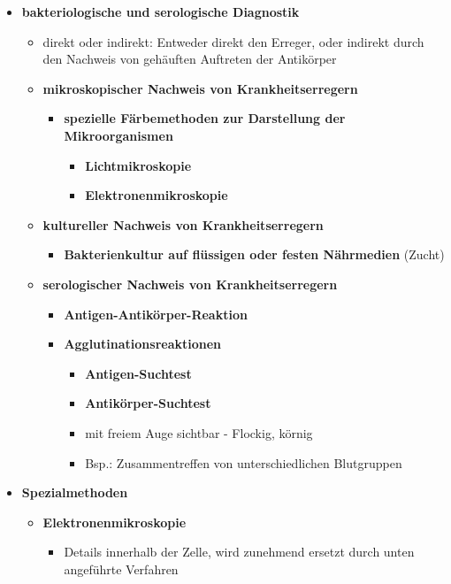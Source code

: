 \begin{itemize}
\pagebreak
		\item \textbf{bakteriologische und serologische Diagnostik}
			\begin{itemize}
				\item direkt oder indirekt: Entweder direkt den Erreger, oder indirekt durch den Nachweis von gehäuften Auftreten der Antikörper
				\item \textbf{mikroskopischer Nachweis von Krankheitserregern}
					\begin{itemize}
						\item \textbf{spezielle Färbemethoden zur Darstellung der Mikroorganismen}
							\begin{itemize}
								\item \textbf{Lichtmikroskopie}
								\item \textbf{Elektronenmikroskopie}
							\end{itemize}
					\end{itemize}
				\item \textbf{kultureller Nachweis von Krankheitserregern}
					\begin{itemize}
						\item \textbf{Bakterienkultur auf flüssigen oder festen Nährmedien} (Zucht)
					\end{itemize}
				\item \textbf{serologischer Nachweis von Krankheitserregern}
					\begin{itemize}
						\item \textbf{Antigen-Antikörper-Reaktion}
						\item \textbf{Agglutinationsreaktionen}
							\begin{itemize}
								\item \textbf{Antigen-Suchtest}
								\item \textbf{Antikörper-Suchtest}
								\item mit freiem Auge sichtbar - Flockig, körnig
								\item Bsp.: Zusammentreffen von unterschiedlichen Blutgruppen
							\end{itemize}
					\end{itemize}
			\end{itemize}
		\item \textbf{Spezialmethoden}
			\begin{itemize}
				\item \textbf{Elektronenmikroskopie}
					\begin{itemize}
						\item Details innerhalb der Zelle, wird zunehmend ersetzt durch unten angeführte Verfahren

\end{itemize}
\end{itemize}
\end{itemize}
